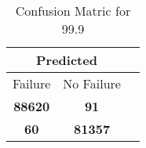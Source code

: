 \begin{table}[] 
\caption{Confusion Matric for 99.9} 
\label{Table: Prediction Accuracy-DMD99.9OnlySunEKF-combinationReflection-Reflection} 
\centering 
\begin{tabular} 
 {@{}ccc@{}} 
\toprule 
\multicolumn{2}{c}{\textbf{Predicted}}
 \\ \midrule 
\multicolumn{1}{|c|}{Failure} & 
\multicolumn{1}{c|}{No Failure}
 \\ \midrule 
\multicolumn{1}{|c|}{\color{green}\textbf{88620}} & 
\multicolumn{1}{c|}{\color{red}\textbf{91}}
 \\ \midrule 
\multicolumn{1}{|c|}{\color{red}\textbf{60}} & 
\multicolumn{1}{c|}{\color{green}\textbf{81357}}
 \\ \bottomrule 
\end{tabular} 
\end{table} 
